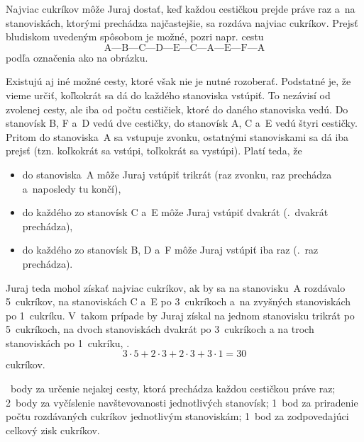 {%
Najviac cukríkov môže Juraj dostať, keď každou cestičkou prejde práve raz
a~na stanoviskách, ktorými prechádza najčastejšie, sa rozdáva najviac cukríkov.
Prejsť bludiskom uvedeným spôsobom je možné, pozri napr. cestu
$$
\text{A---B---C---D---E---C---A---E---F---A}
$$
podľa označenia ako na obrázku.
%

Existujú aj iné možné cesty, ktoré však nie je nutné rozoberať.
Podstatné je, že vieme určiť, koľkokrát sa dá do každého stanoviska vstúpiť.
To nezávisí od zvolenej cesty, ale iba od počtu cestičiek, ktoré do daného
stanoviska vedú.
Do stanovísk B, F a~D vedú dve cestičky, do stanovísk A, C a~E vedú štyri
cestičky.
Pritom do stanoviska~A sa vstupuje zvonku, ostatnými stanoviskami sa dá iba
prejsť (tzn. koľkokrát sa vstúpi, toľkokrát sa vystúpi).
Platí teda, že
\begin{itemize}
\item do stanoviska~A môže Juraj vstúpiť trikrát (raz zvonku, raz
prechádza a~naposledy tu končí),
\item do každého zo stanovísk C a~E môže Juraj vstúpiť dvakrát (\tj.~dvakrát prechádza),
\item do každého zo stanovísk B, D a~F môže Juraj vstúpiť iba raz
(\tj.~raz prechádza).
\end{itemize}
Juraj teda mohol získať najviac cukríkov, ak by sa na stanovisku~A
rozdávalo 5~cukríkov, na stanoviskách C a~E po 3~cukríkoch a~na zvyšných
stanoviskách po 1~cukríku.
V~takom prípade by Juraj získal na jednom stanovisku trikrát po 5~cukríkoch,
na dvoch stanoviskách dvakrát po 3~cukríkoch a na troch stanoviskách po 1~cukríku, \tj.
$$
3\cdot5+2\cdot3+2\cdot3+3\cdot1=30
$$
cukríkov.

~body za určenie nejakej cesty, ktorá prechádza každou cestičkou práve raz;
2~body za vyčíslenie navštevovanosti jednotlivých stanovísk;
1~bod za priradenie počtu rozdávaných cukríkov jednotlivým stanoviskám;
1~bod za zodpovedajúci celkový zisk cukríkov.
\endhodnotenie
}

